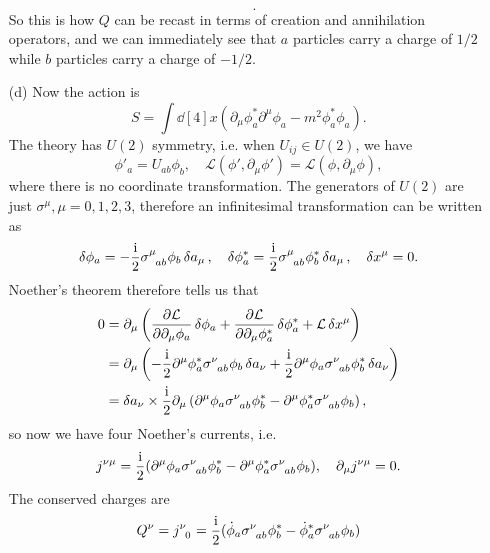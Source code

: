 \documentclass[hyperref, a4paper]{article}
\newcommand*{\ii}{\mathrm{i}}
\begin{document}
\begin{itemize}
\begin{equation}
\begin{aligned}
        \end{aligned}.
    \end{equation}
    So this is how $Q$ can be recast in terms of creation and annihilation operators, and we can immediately see that $a$ particles carry a charge of $1/2$ while $b$ particles carry a charge of $-1/2$.
    \item[(d)] Now the action is 
    \begin{equation}
        S = \int \dd[4]{x} (\partial_\mu \phi^*_a \partial^\mu \phi_a - m^2 \phi^*_a \phi_a).
    \end{equation} 
    The theory has $U(2)$ symmetry, i.e. when $U_{ij} \in U(2)$, we have 
    \[
        \phi'_a = U_{ab} \phi_b, \quad \mathcal{L}(\phi', \partial_\mu \phi') = \mathcal{L}(\phi, \partial_\mu \phi),
    \]
    where there is no coordinate transformation.
    The generators of $U(2)$ are just $\sigma^\mu, \mu = 0, 1, 2, 3$, therefore an infinitesimal transformation can be written as 
    \[
        \var{\phi_a} = - \frac{\ii}{2} \sigma\indices{^\mu_{ab}} \phi_b \var{a_\mu}, \quad \var{\phi^*_a} = \frac{\ii}{2} \sigma\indices{^\mu_{ab}} \phi^*_b \var{a_\mu}, \quad \var{x^\mu} = 0.
    \]
    Noether's theorem therefore tells us that 
    \[
        \begin{aligned}
            0 &= \partial_\mu \left( \pdv{\mathcal{L}}{\partial_\mu \phi_a} \var{\phi_a} + \pdv{\mathcal{L}}{\partial_\mu \phi^*_a} \var{\phi^*_a} + \mathcal{L} \var{x^\mu} \right) \\
            &= \partial_\mu \left( - \frac{\ii}{2} \partial^\mu \phi_a^* \sigma\indices{^\nu_{ab}} \phi_b \var{a_\nu} + \frac{\ii}{2} \partial^\mu \phi_a \sigma\indices{^\nu_{ab}} \phi^*_b \var{a_\nu} \right) \\
            &= \var{a_\nu} \times \frac{\ii}{2} \partial_\mu \left( \partial^\mu \phi_a \sigma\indices{^\nu_{ab}} \phi^*_b - \partial^\mu \phi_a^* \sigma\indices{^\nu_{ab}} \phi_b \right),
        \end{aligned}
    \]
    so now we have four Noether's currents, i.e.
    \begin{equation}
        j\indices{^\nu^\mu} = \frac{\ii}{2} ( \partial^\mu \phi_a \sigma\indices{^\nu_{ab}} \phi^*_b - \partial^\mu \phi_a^* \sigma\indices{^\nu_{ab}} \phi_b), \quad \partial_\mu j\indices{^\nu^\mu} = 0.
    \end{equation}
    The conserved charges are 
    \begin{equation}
        \begin{aligned}
            Q^\nu &= j\indices{^\nu_0} = \frac{\ii}{2} (\dot{\phi}_a \sigma\indices{^\nu_{ab}} \phi_b^* - \dot{\phi}^*_a \sigma\indices{^\nu_{ab}} \phi_b) \\

\end{aligned}
\end{equation}
\end{itemize}
\end{document}

